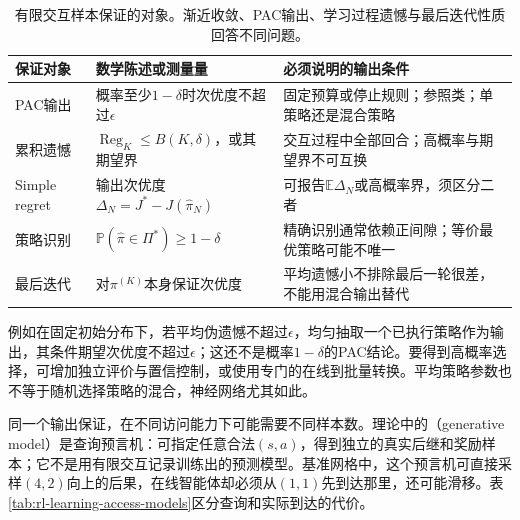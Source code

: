 \begin{table}[t]
  \centering
  \small
  \begin{tabularx}{\linewidth}{>{\raggedright\arraybackslash}p{24mm} >{\raggedright\arraybackslash}X >{\raggedright\arraybackslash}X}
    \toprule
    保证对象 & 数学陈述或测量量 & 必须说明的输出条件 \\
    \midrule
    PAC输出 & 概率至少$1-\delta$时次优度不超过$\epsilon$ & 固定预算或停止规则；参照类；单策略还是混合策略 \\
    累积遗憾 & $\operatorname{Reg}_K\leq B(K,\delta)$，或其期望界 & 交互过程中全部回合；高概率与期望界不可互换 \\
    Simple regret & 输出次优度$\Delta_N=J^*-J(\widehat\pi_N)$ & 可报告$\mathbb E\Delta_N$或高概率界，须区分二者 \\
    策略识别 & $\mathbb P(\widehat\pi\in\Pi^*)\geq1-\delta$ & 精确识别通常依赖正间隙；等价最优策略可能不唯一 \\
    最后迭代 & 对$\pi^{(K)}$本身保证次优度 & 平均遗憾小不排除最后一轮很差，不能用混合输出替代 \\
    \bottomrule
  \end{tabularx}
  \caption{有限交互样本保证的对象。渐近收敛、PAC输出、学习过程遗憾与最后迭代性质回答不同问题。}
  \label{tab:rl-learning-guarantee-objects}
\end{table}

例如在固定初始分布下，若平均伪遗憾不超过$\epsilon$，均匀抽取一个已执行策略作为输出，其条件期望次优度不超过$\epsilon$；这还不是概率$1-\delta$的PAC结论。要得到高概率选择，可增加独立评价与置信控制，或使用专门的在线到批量转换。平均策略参数也不等于随机选择策略的混合，神经网络尤其如此。

同一个输出保证，在不同访问能力下可能需要不同样本数。理论中的（generative model）是查询预言机：可指定任意合法$(s,a)$，得到独立的真实后继和奖励样本；它不是用有限交互记录训练出的预测模型。基准网格中，这个预言机可直接采样$(4,2)$向上的后果，在线智能体却必须从$(1,1)$先到达那里，还可能滑移。表\ref{tab:rl-learning-access-models}区分查询和实际到达的代价。

